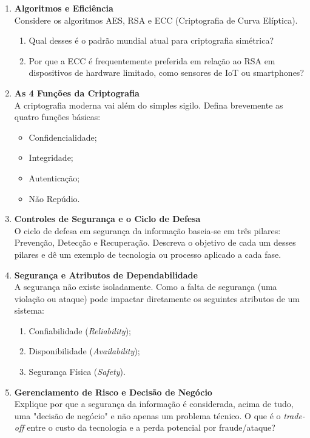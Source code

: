 \documentclass[12pt]{article}
\begin{document}
\begin{enumerate}[label=\textbf{Questão \arabic*:}, leftmargin=1.5cm, labelsep=0.5cm]
    \item \textbf{Algoritmos e Eficiência} \\
    Considere os algoritmos AES, RSA e ECC (Criptografia de Curva Elíptica).
    \begin{enumerate}[label=\alph*)]
        \item Qual desses é o padrão mundial atual para criptografia simétrica?
        \item Por que a ECC é frequentemente preferida em relação ao RSA em dispositivos de hardware limitado, como sensores de IoT ou smartphones?
    \end{enumerate}

    \item \textbf{As 4 Funções da Criptografia} \\
    A criptografia moderna vai além do simples sigilo. Defina brevemente as quatro funções básicas:
    \begin{itemize}
        \item Confidencialidade;
        \item Integridade;
        \item Autenticação;
        \item Não Repúdio.
    \end{itemize}

    \item \textbf{Controles de Segurança e o Ciclo de Defesa} \\
    O ciclo de defesa em segurança da informação baseia-se em três pilares: Prevenção, Detecção e Recuperação. Descreva o objetivo de cada um desses pilares e dê um exemplo de tecnologia ou processo aplicado a cada fase.

    \item \textbf{Segurança e Atributos de Dependabilidade} \\
    A segurança não existe isoladamente. Como a falta de segurança (uma violação ou ataque) pode impactar diretamente os seguintes atributos de um sistema:
    \begin{enumerate}[label=\alph*)]
        \item Confiabilidade (\textit{Reliability});
        \item Disponibilidade (\textit{Availability});
        \item Segurança Física (\textit{Safety}).
    \end{enumerate}

    \item \textbf{Gerenciamento de Risco e Decisão de Negócio} \\
    Explique por que a segurança da informação é considerada, acima de tudo, uma "decisão de negócio" e não apenas um problema técnico. O que é o \textit{trade-off} entre o custo da tecnologia e a perda potencial por fraude/ataque?


\end{enumerate}
\end{document}

